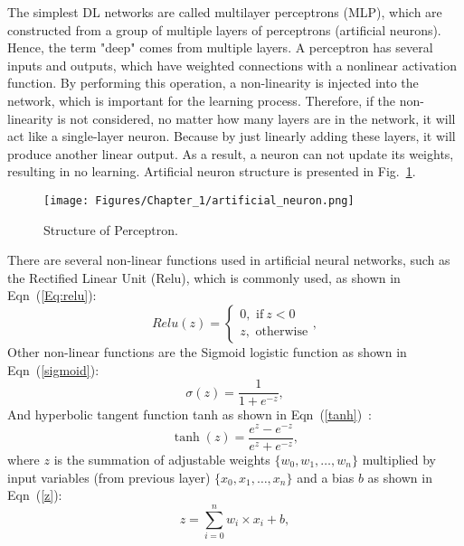 The simplest DL networks are called multilayer perceptrons (MLP), which are construct\-ed from a group of multiple layers of perceptrons (artificial neurons).
Hence, the term "deep" comes from multiple layers.
A perceptron has several inputs and outputs, which have weighted connections with a nonlinear activation function.
By performing this operation, a non-linearity is injected into the network, which is important for the learning process.
Therefore, if the non-linearity is not considered, no matter how many layers are in the network, it will act like a single-layer neuron. 
Because by just linearly adding these layers, it will produce another linear output.
As a result, a neuron can not update its weights, resulting in no learning.
Artificial neuron structure is presented in Fig.~\ref{fig:artificial Neuron}.
\begin{figure} [!ht]
	\begin{center}
		\centering
		\texttt{[image: Figures/Chapter\_1/artificial\_neuron.png]}
	\end{center}
	\caption{Structure of Perceptron.} 
	\label{fig:artificial Neuron}
\end{figure}
There are several non-linear functions used in artificial neural networks, such as the Rectified Linear Unit (Relu), which is commonly used, as shown in Eqn~(\ref{Eq:relu}):
\begin{equation}
	Relu(z) = 
	\begin{cases}
		0,  \text{  if}\ z<0\\
		z,  \text{  otherwise}
	\end{cases},
	\label{Eq:relu}
\end{equation}
Other non-linear functions are the Sigmoid logistic function as shown in Eqn~(\ref{sigmoid}):
\begin{equation}
	\sigma(z) = \frac{1}{1+e^{-z}},
	\label{sigmoid}
\end{equation}
And hyperbolic tangent function tanh as shown in Eqn~(\ref{tanh})~\cite{Lecun2015}:
\begin{equation}
	\tanh(z)=  \frac{e^z-e^{-z}}{e^z+e^{-z}},
	\label{tanh}
\end{equation}
where \(z\) is the summation of adjustable weights \(\{w_0,w_1,\dots,w_n \}\) multiplied by input variables (from previous layer) \(\{x_0,x_1,\dots,x_n\}\) and a bias \(b\) as shown in Eqn~(\ref{z}):
\begin{equation}
	z= \sum_{i=0}^{n}  w_i\times x_i +b,
	\label{z}
\end{equation}

